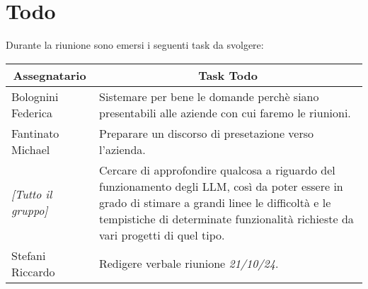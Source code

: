 \section{Todo}

Durante la riunione sono emersi i seguenti task da svolgere:

\vspace{0.5cm}

\begin{table}[htbp]
\begin{tabular}{|p{}|p{}|}
    \hline
    \multicolumn{1}{|c|}{\textbf{Assegnatario}} & \multicolumn{1}{|c|}{\textbf{Task Todo}} \\
    \hline
    Bolognini Federica & Sistemare per bene le domande perchè siano presentabili alle aziende con cui faremo le riunioni. \\
    \hline
    Fantinato Michael & Preparare un discorso di presetazione verso l'azienda. \\
    \hline
    \emph{[Tutto il gruppo]} & Cercare di approfondire qualcosa a riguardo del funzionamento degli LLM, così da poter essere in grado di stimare a grandi linee le difficoltà e le tempistiche di determinate funzionalità richieste da vari progetti di quel tipo. \\
    \hline
    Stefani Riccardo & Redigere verbale riunione \emph{21/10/24}. \\
    \hline
\end{tabular}
\end{table}